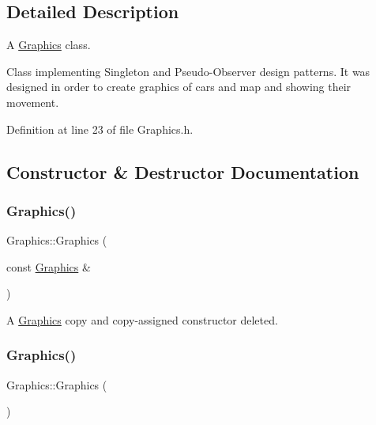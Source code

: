 \subsection{Detailed Description}
A \hyperlink{classGraphics}{Graphics} class. 

Class implementing Singleton and Pseudo-\/\+Observer design patterns. It was designed in order to create graphics of cars and map and showing their movement. 

Definition at line 23 of file Graphics.\+h.



\subsection{Constructor \& Destructor Documentation}
\mbox{\label{classGraphics_abe2f13f24a1d35c55fdac10a282744eb}} 
\subsubsection{\texorpdfstring{Graphics()}{Graphics()}\hspace{0.1cm}{\footnotesize\ttfamily [1/2]}}
{\footnotesize\ttfamily Graphics\+::\+Graphics (\begin{DoxyParamCaption}\item[{const \hyperlink{classGraphics}{Graphics} \&}]{ }\end{DoxyParamCaption})\hspace{0.3cm}{\ttfamily [delete]}}



A \hyperlink{classGraphics}{Graphics} copy and copy-\/assigned constructor deleted. 

\mbox{\label{classGraphics_af2e8fe67fd31ec263c843a6e28b29d3c}} 
\subsubsection{\texorpdfstring{Graphics()}{Graphics()}\hspace{0.1cm}{\footnotesize\ttfamily [2/2]}}
{\footnotesize\ttfamily Graphics\+::\+Graphics (\begin{DoxyParamCaption}{ }\end{DoxyParamCaption})\hspace{0.3cm}{\ttfamily [private]}}



